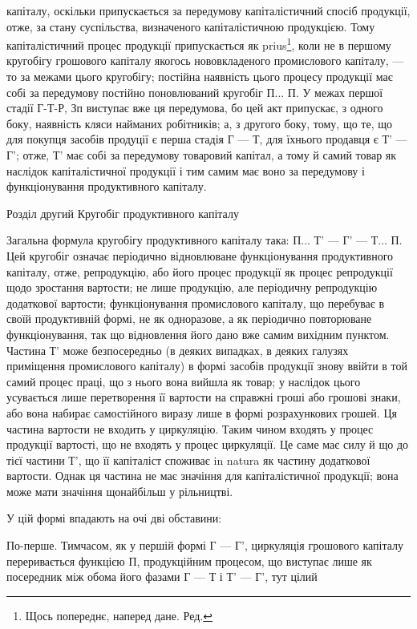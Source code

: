 капіталу, оскільки припускається за передумову капіталістичний спосіб
продукції, отже, за стану суспільства, визначеного капіталістичною продукцією.
Тому капіталістичний процес продукції припускається як prius\footnote*{
Щось попереднє, наперед дане. Ред.
},
коли не в першому кругобігу грошового капіталу якогось нововкладеного
промислового капіталу, — то за межами цього кругобігу; постійна наявність
цього процесу продукції має собі за передумову постійно поновлюваний кругобіг П... П. У межах першої
стадії Г-Т-Р, Зп виступає вже ця передумова, бо цей акт припускає, з одного боку, наявність кляси
найманих робітників; а, з другого боку, тому, що те, що для покупця
засобів продуції є перша стадія Г — Т, для їхнього продавця є Т' — Г';
отже, Т' має собі за передумову товаровий капітал, а тому й самий
товар як наслідок капіталістичної продукції і тим самим має воно за
передумову і функціонування продуктивного капіталу.

Розділ другий
Кругобіг продуктивного капіталу

Загальна формула кругобігу продуктивного капіталу така: П... Т' —
Г' — Т... П. Цей кругобіг означає періодично відновлюване функціонування
продуктивного капіталу, отже, репродукцію, або його процес
продукції як процес репродукції щодо зростання вартости; не лише
продукцію, але періодичну репродукцію додаткової вартости; функціонування
промислового капіталу, що перебуває в своїй продуктивній формі,
не як одноразове, а як періодично повторюване функціонування, так що
відновлення його дано вже самим вихідним пунктом. Частина Т' може
безпосередньо (в деяких випадках, в деяких галузях приміщення промислового
капіталу) в формі засобів продукції знову ввійти в той самий
процес праці, що з нього вона вийшла як товар; у наслідок цього усувається
лише перетворення її вартости на справжні гроші або грошові
знаки, або вона набирає самостійного виразу лише в формі розрахункових
грошей. Ця частина вартости не входить у циркуляцію. Таким чином
входять у процес продукції вартості, що не входять у процес циркуляції.
Це саме має силу й що до тієї частини Т', що її капіталіст споживає
in natura як частину додаткової вартости. Однак ця частина не має значіння
для капіталістичної продукції; вона може мати значіння щонайбільш
у рільництві.

У цій формі впадають на очі дві обставини:

По-перше. Тимчасом, як у першій формі Г — Г', циркуляція грошового
капіталу переривається функцією П, продукційним процесом, що виступає
лише як посередник між обома його фазами Г — Т і Т' — Г', тут цілий